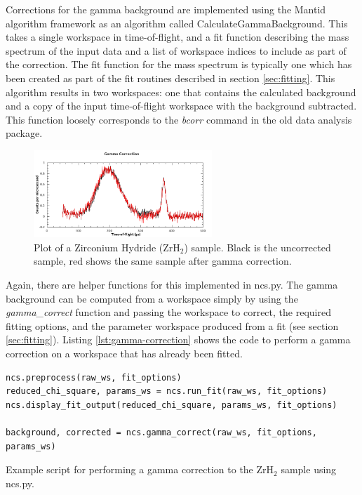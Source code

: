 \documentclass[paper=a4, fontsize=11pt]{scrartcl}	%
\numberwithin{equation}{section}															%
\numberwithin{figure}{section}																%
\numberwithin{table}{section}
\begin{document}
Corrections for the gamma background are implemented using the Mantid algorithm framework as an algorithm called CalculateGammaBackground. This takes a single workspace in time-of-flight, and a fit function describing the mass spectrum of the input data and a list of workspace indices to include as part of the correction. The fit function for the mass spectrum is typically one which has been created as part of the fit routines described in section \ref{sec:fitting}. This algorithm results in two workspaces: one that contains the calculated background and a copy of the input time-of-flight workspace with the background subtracted. This function loosely corresponds to the \textit{bcorr} command in the old data analysis package.

\begin{figure}[H]
\centering
\includegraphics[width=0.6\textwidth]{img/corrections-gamma.png}
\caption{Plot of a Zirconium Hydride (ZrH$_2$) sample. Black is the uncorrected sample, red shows the same sample after gamma correction.}
\label{fig:corrections-gamma}
\end{figure}

Again, there are helper functions for this implemented in ncs.py. The gamma background can be computed from a workspace simply by using the \textit{gamma\_correct} function and passing the workspace to correct, the required fitting options, and the parameter workspace produced from a fit (see section \ref{sec:fitting}). Listing \ref{lst:gamma-correction} shows the code to perform a gamma correction on a workspace that has already been fitted.

\begin{listing}[H]
\begin{verbatim}
ncs.preprocess(raw_ws, fit_options)
reduced_chi_square, params_ws = ncs.run_fit(raw_ws, fit_options)
ncs.display_fit_output(reduced_chi_square, params_ws, fit_options)

background, corrected = ncs.gamma_correct(raw_ws, fit_options, params_ws)
\end{verbatim}
\caption{Example script for performing a gamma correction to the ZrH$_2$ sample using ncs.py.}
\label{lst:gamma-correction}
\end{listing}
\end{document}
